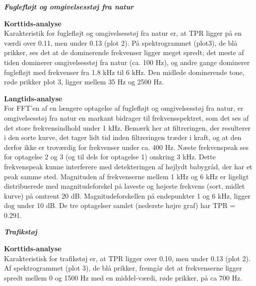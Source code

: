 
\newpage
\begin{center} \textit{\textbf{Fuglefløjt og omgivelsesstøj fra natur}} \end{center}
\textbf{Korttids-analyse} \\
Karakteristik for fuglefløjt og omgivelsesstøj fra natur er, at TPR ligger på en værdi over 0.11, men under 0.13 (plot 2). På spektrogrammet (plot3), de blå prikker, ses det at de dominerende frekvenser ligger meget spredt; det meste af tiden dominerer omgivelsesstøj fra natur (ca. 100 Hz), og andre gange dominerer fuglefløjt med frekvenser fra 1.8 kHz til 6 kHz. Den midlede dominerende tone, røde prikker plot 3, ligger mellem 35 Hz og 2500 Hz.


\newpage
\textbf{Langtids-analyse} \\
For FFT'en af en længere optagelse af fuglefløjt og omgivelsesstøj fra natur, er omgivelsesstøj fra natur en markant bidrager til frekvensspektret, som det ses af det store frekvensindhold under 1 kHz. Bemærk her at filtreringen, der resulterer i den sorte kurve, det tager lidt tid inden filtreringen træder i kraft, og at den derfor ikke er troværdig for frekvenser under ca. 400 Hz. Næste frekvenspeak ses for optagelse 2 og 3 (og til dels for optagelse 1) omkring 3 kHz. Dette frekvenspeak kunne interferere med detekteringen af højlydt babygråd, der har et peak samme sted. Magnituden af frekvenserne mellem 1 kHz og 6 kHz er ligeligt distribuerede med magnitudeforskel på laveste og højeste frekvens (sort, midlet kurve) på omtrent 20 dB. Magnitudeforskellen på endepunkter 1 og 6 kHz, ligger dog under 10 dB.
De tre optagelser samlet (nederste højre graf) har TPR = 0.291.


\newpage
\begin{center}\textit{\textbf{Trafikstøj}}\end{center}
\textbf{Korttids-analyse} \\
Karakteristisk for trafikstøj er, at TPR ligger over 0.10, men under 0.13 (plot 2). Af spektrogrammet (plot 3), de blå prikker, fremgår det at frekvenserne ligger spredt mellem 0 og 1500 Hz med en middel-værdi, røde prikker, på ca 700 Hz.

